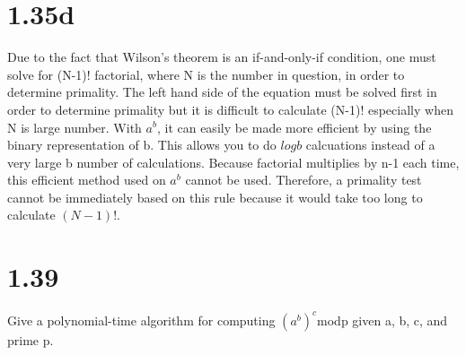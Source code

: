 \documentclass[12pt]{article}
\begin{document}
\section*{1.35d}
Due to the fact that Wilson's theorem is an if-and-only-if condition, one must solve for (N-1)! factorial, where N is the number in question, in order to determine primality. The left hand side of the equation must be solved first in order to determine primality but it is difficult to calculate (N-1)! especially when N is large number. With $a^b$, it can easily be made more efficient by using the binary representation of b. This allows you to do $logb$ calcuations instead of a very large b number of calculations. Because factorial multiplies by n-1 each time, this efficient method used on $a^b$ cannot be used. Therefore, a primality test cannot be immediately based on this rule because it would take too long to calculate $(N-1)!$.

\section*{1.39}
Give a polynomial-time algorithm for computing $(a^b)^c$modp given a, b, c, and prime p.
\\
        
\end{document}
